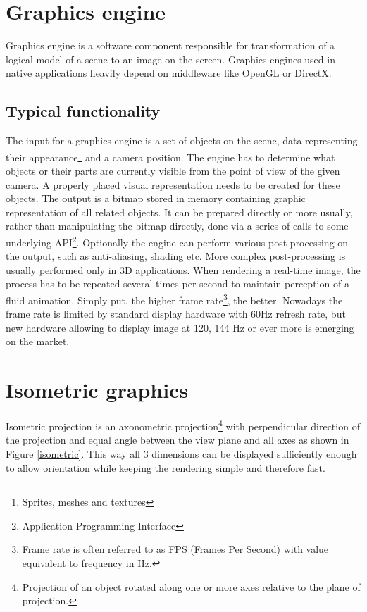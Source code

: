 \documentclass[11pt,oneside, final]{fithesis2}
\begin{document}
\section{Graphics engine}
Graphics engine is a software component responsible for transformation of a logical model of a scene to an image on the screen. Graphics engines used in native applications heavily depend on middleware like OpenGL or DirectX\cite{gregory}.

\subsection{Typical functionality}
\label{enginefunctionality}
The input for a graphics engine is a set of objects on the scene, data representing their appearance\footnote{Sprites, meshes and textures} and a camera position. The engine has to determine what objects or their parts are currently visible from the point of view of the given camera. A properly placed visual representation needs to be created for these objects. The output is a bitmap stored in memory containing graphic representation of all related objects. It can be prepared directly or more usually, rather than manipulating the bitmap directly, done via a series of calls to some underlying API\footnote{Application Programming Interface}. Optionally the engine can perform various post-processing on the output, such as anti-aliasing, shading etc.\cite{gregory} More complex post-processing is usually performed only in 3D applications. When rendering a real-time image, the process has to be repeated several times per second to maintain perception of a fluid animation. Simply put, the higher frame rate\footnote{Frame rate is often referred to as FPS (Frames Per Second) with value equivalent to frequency in Hz.}, the better\cite{claypool}. Nowadays the frame rate is limited by standard display hardware with 60Hz refresh rate, but new hardware allowing to display image at 120, 144 Hz or ever more is emerging on the market.

\section{Isometric graphics}
Isometric projection is an axonometric projection\footnote{Projection of an object rotated along one or more axes relative to the plane of projection\cite{maynard}.} with perpendicular direction of the projection and equal angle between the view plane and all axes\cite{desai} as shown in Figure \ref{isometric}. This way all 3 dimensions can be displayed sufficiently enough to allow orientation while keeping the rendering simple and therefore fast. 
\end{document}
